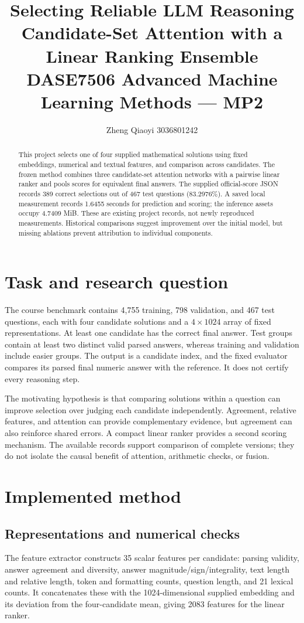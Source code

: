 \documentclass[11pt]{article}
\title{\vspace{-1.3cm}Selecting Reliable LLM Reasoning\\[3pt]\large Candidate-Set Attention with a Linear Ranking Ensemble\\[3pt]\normalsize DASE7506 Advanced Machine Learning Methods --- MP2}
\author[*]{\small Zheng Qiaoyi 3036801242}
\affil[*]{\small  Robotics and Intelligent Systems, DASE}
\date{}
\begin{document}
\maketitle
\vspace{-0.8cm}

\begin{abstract}
This project selects one of four supplied mathematical solutions using fixed embeddings, numerical and textual features, and comparison across candidates. The frozen method combines three candidate-set attention networks with a pairwise linear ranker and pools scores for equivalent final answers. The supplied official-score JSON records 389 correct selections out of 467 test questions (83.2976\%). A saved local measurement records 1.6455 seconds for prediction and scoring; the inference assets occupy 4.7409 MiB. These are existing project records, not newly reproduced measurements. Historical comparisons suggest improvement over the initial model, but missing ablations prevent attribution to individual components.
\end{abstract}

\section{Task and research question}
The course benchmark contains 4,755 training, 798 validation, and 467 test questions, each with four candidate solutions and a $4\times1024$ array of fixed representations. At least one candidate has the correct final answer. Test groups contain at least two distinct valid parsed answers, whereas training and validation include easier groups. The output is a candidate index, and the fixed evaluator compares its parsed final numeric answer with the reference. It does not certify every reasoning step.

The motivating hypothesis is that comparing solutions within a question can improve selection over judging each candidate independently. Agreement, relative features, and attention can provide complementary evidence, but agreement can also reinforce shared errors. A compact linear ranker provides a second scoring mechanism. The available records support comparison of complete versions; they do not isolate the causal benefit of attention, arithmetic checks, or fusion.

\section{Implemented method}
\subsection{Representations and numerical checks}
The feature extractor constructs 35 scalar features per candidate: parsing validity, answer agreement and diversity, answer magnitude/sign/integrality, text length and relative length, token and formatting counts, question length, and 21 lexical counts. It concatenates these with the 1024-dimensional supplied embedding and its deviation from the four-candidate mean, giving 2083 features for the linear ranker.
\end{document}
